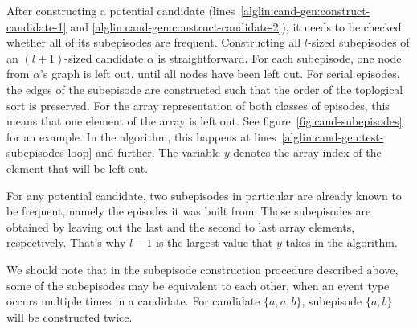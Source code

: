 After constructing a potential candidate (lines~\ref{alglin:cand-gen:construct-candidate-1} and \ref{alglin:cand-gen:construct-candidate-2}), it needs to be checked whether all of its subepisodes are frequent.
Constructing all $ l $-sized subepisodes of an $ (l + 1) $-sized candidate $ \alpha $ is straightforward. For each subepisode, one node from $ \alpha $'s graph is left out, until all nodes have been left out. For serial episodes, the edges of the subepisode are constructed such that the order of the toplogical sort is preserved.
For the array representation of both classes of episodes, this means that one element of the array is left out. See figure~\ref{fig:cand-subepisodes} for an example. In the algorithm, this happens at lines~\ref{alglin:cand-gen:test-subepisodes-loop} and further. The variable $ y $ denotes the array index of the element that will be left out.

For any potential candidate, two subepisodes in particular are already known to be frequent, namely the episodes it was built from. Those subepisodes are obtained by leaving out the last and the second to last array elements, respectively. That's why $ l - 1 $ is the largest value that $ y $ takes in the algorithm.

We should note that in the subepisode construction procedure described above, some of the subepisodes may be equivalent to each other, when an event type occurs multiple times in a candidate. For candidate $ \{ a, a, b \} $, subepisode $ \{ a, b \} $ will be constructed twice.

